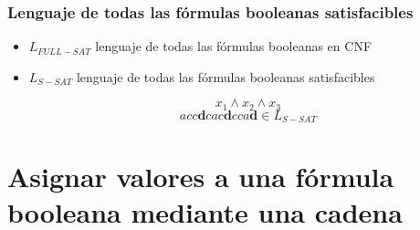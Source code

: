 \documentclass{beamer}
\begin{document}
\begin{frame}
    \frametitle{Lenguaje de todas las fórmulas booleanas satisfacibles}
    
    \begin{itemize}
        \item $L_{FULL-SAT}$ lenguaje de todas las fórmulas booleanas en CNF
              \pause
        \item  $L_{S-SAT}$ lenguaje de todas las fórmulas booleanas satisfacibles
              \pause
              \begin{Large}

                  $$x_1\wedge x_2 \wedge x_3$$
                  $$acc\mathbf{d}cac\mathbf{d}cca\mathbf{d}\in L_{S-SAT}$$
                  
              \end{Large}
              
    \end{itemize}
\end{frame}

\section{Asignar valores a una fórmula booleana mediante una cadena}
\end{document}
